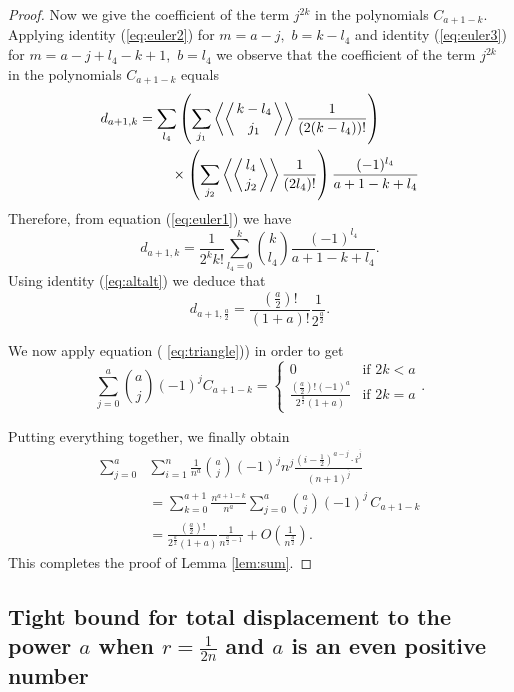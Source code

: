 \documentclass[final,5p,times,twocolumn]{elsarticle_mod}
\begin{document}
\begin{proof}
Now we give the coefficient of the term $j^{2k}$ in the polynomials $C_{a+1-k}.$
Applying identity (\ref{eq:euler2}) for $m=a-j,$ $b=k-l_4$ and identity (\ref{eq:euler3}) for
$m=a-j+l_4-k+1,$ $b=l_4$ we observe that the coefficient of the term $j^{2k}$ in the polynomials $C_{a+1-k}$ equals
\begin{align*}
d_{a+1,k}
&=\sum_{l_4}\left(\sum_{j_1}\left\langle\left\langle k-l_4\atop j_1\right\rangle\right\rangle \frac{1}{(2(k-l_4))!}\right)\\
&~~~~~~~\times\left(\sum_{j_2}  \left\langle\left\langle l_4\atop j_2\right\rangle\right\rangle \frac{1}{(2l_4)!}\right)\frac{(-1)^{l_4}}{a+1-k+l_4}
\end{align*}
Therefore, from equation (\ref{eq:euler1}) we have
$$
d_{a+1,k}=\frac{1}{2^k k!}\sum_{l_4=0}^{k}\binom{k}{l_4}\frac{(-1)^{l_4}}{a+1-k+l_4}.
$$
Using identity (\ref{eq:altalt}) we deduce that
$$
d_{a+1,\frac{a}{2}}=\frac{\left(\frac{a}{2}\right)!}{(1+a)!}\frac{1}{2^{\frac{a}{2}}}.
$$

We now apply equation ( \ref{eq:triangle})) in order to  get
$$
\sum_{j=0}^{a}\binom{a}{j}(-1)^jC_{a+1-k}=\begin{cases} 0 &\mbox{if } 2k <a \\
\frac{\left(\frac{a}{2}\right)!(-1)^a}{2^{\frac{a}{2}}(1+a)} & \mbox{if } 2k=a \end{cases}.
$$

Putting everything together, we finally obtain
\begin{align*}
\sum_{j=0}^{a}&\sum_{i=1}^{n}\frac{1}{n^a}\binom{a}{j}(-1)^jn^j  \frac{ \left(i-\frac{1}{2}\right)^{a-j}\cdot i^{\overline{j}}}{(n+1)^{\overline{j}}}\\
&=\sum_{k=0}^{a+1}\frac{n^{a+1-k}}{n^a}\sum_{j=0}^{a}\binom{a}{j}(-1)^j\, C_{a+1-k}\\
&=\frac{\left(\frac{a}{2}\right)!}{2^{\frac{a}{2}}(1+a)}\frac{1}{n^{\frac{a}{2}-1}}+
O\left(\frac{1}{n^{\frac{a}{2}}}\right).
\end{align*}
This completes the proof of Lemma \ref{lem:sum}.
\end{proof}

\subsection{Tight bound for total displacement to the power $a$ when $r=\frac{1}{2n}$ and $a$ is an even positive number}
\end{document}
